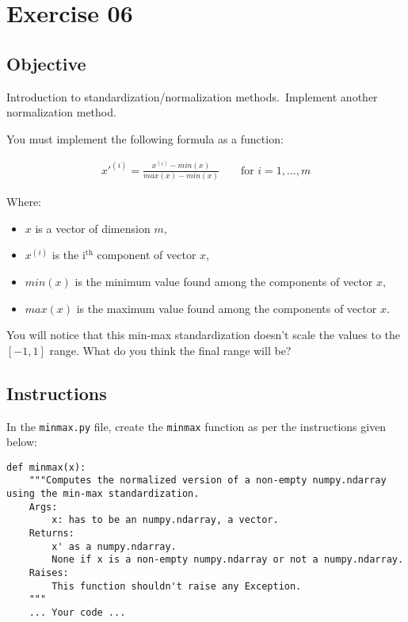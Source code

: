 \chapter{Exercise 06}
\makeheaderfilesforbidden


\section*{Objective}
Introduction to standardization/normalization methods.\
Implement another normalization method.

You must implement the following formula as a function: 

$$
\begin{matrix}
  x'^{(i)} = \frac{x^{(i)} - min(x)}{max(x) - min(x)} & & \text{ for $i = 1, ..., m$}
\end{matrix}
$$

Where:
\begin{itemize}
  \item $x$ is a vector of dimension $m$,
  \item $x^{(i)}$ is the i$^\text{th}$ component of vector $x$,
  \item $min(x)$ is the minimum value found among the components of vector $x$,
  \item $max(x)$ is the maximum value found among the components of vector $x$.
\end{itemize}

You will notice that this min-max standardization doesn't scale the values to the $[-1,1]$ range.
What do you think the final range will be?

\section*{Instructions}
In the \texttt{minmax.py} file, create the \texttt{minmax} function as per the instructions given below:

\begin{verbatim}
def minmax(x):
	"""Computes the normalized version of a non-empty numpy.ndarray using the min-max standardization.
	Args:
		x: has to be an numpy.ndarray, a vector.
	Returns:
		x' as a numpy.ndarray. 
		None if x is a non-empty numpy.ndarray or not a numpy.ndarray.
	Raises:
		This function shouldn't raise any Exception.
	"""
    ... Your code ...
\end{verbatim}

